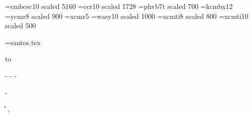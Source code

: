 %

\font\bigggfnt=cmbcsc10 scaled 5160
\font\biggfnt=ccr10 scaled 1728
\font\hvs=phvb7t scaled 700 %
\font\rs=kcmbx12
\font\kore=ycmr8 scaled 900
\font\kone=xcmr5
\font\wasy=wasy10 scaled 1000
\font\fntsan=xcmti8 scaled 800
\font\korec=xcmti10 scaled 500

\def\glifo#1#2#3{\vbox to#2{\hsize#1
  \hrule height#2 depth0pt width0pt
  \noindent\special{pdf:image width #1 height #2 (#3.jpg)}}}

\newtoks\santoral
\newread\santo
\immediate\openin\santo=santos.tex

\newcount\anio
\immediate{}
\message{> }
 to \anioe
\anio\number\anioe
\advance{}

\newcount\auxiliar
\newcount\residuo
\def\mod#1|#2{\auxiliar#1\residuo#1%
\divide\auxiliar#2\multiply\auxiliar#2\advance\residuo-\auxiliar}

\newif\ifbisiesto
\mod\anio|{400}
\ifnum{}\global\bisiestotrue\else\global\bisiestofalse\fi
\mod\anio|{100}
\ifnum{}
  \else\ifbisiesto\global\bisiestofalse\else\global\bisiestotrue\fi\fi
\mod\anio|4 \ifnum{}\else\global\bisiestofalse\fi

\newcount\anios
{}\advance\anios\anio

\newcount\bisiestos
{}\advance\auxiliar\anios\divide{} \bisiestos-\auxiliar
\divide{}\advance\bisiestos\auxiliar
{}\advance\auxiliar\anios\divide{}\advance\bisiestos\auxiliar

\newcount\mes{}
\newcount\dia{}

\newcount\dias
\dias\anios\multiply{}\advance\dias\bisiestos\advance{}

\newcount\n
\newcount\m
\def\\{\ifnum\n<\p\global\advance\n1\else
  \ifnum\m<\U\number\m\global\advance\m1\fi\fi}

\newcount\transcurridos
\newcount\U
\newcount\p
\newbox\dica
\newbox\ene
\newbox\feb
\newbox\mar
\newbox\abr
\newbox\may
\newbox\jun
\newbox\jul
\newbox\ago
\newbox\sep
\newbox\oct
\newbox\nov
\newbox\dic
\newbox\enes

